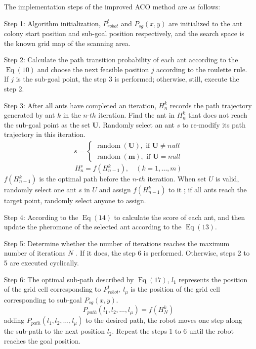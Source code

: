 \documentclass{iosart2c}
\begin{document}
The implementation steps of the improved ACO method are as follows:

Step 1: Algorithm initialization, $P_{robot}^{t}$ and $P_{sg}(x,y)$ are initialized to the ant colony start position and sub-goal position respectively, and the search space is the known grid map of the scanning area.

Step 2: Calculate the path transition probability of each ant according to the $\operatorname{Eq}(10)$ and choose the next feasible position $j$ according to the roulette rule. If $j$ is the sub-goal point, the step 3 is performed; otherwise, still, execute the step 2.

Step 3: After all ants have completed an iteration, $H_{n}^{k}$ records the path trajectory generated by ant $k$ in the $n$-$th$ iteration. Find the ant in $H_{n}^{k}$ that does not reach the sub-goal point as the set $\mathbf{U}$. Randomly select an ant $s$ to re-modify its path trajectory in this iteration.
\begin{equation} %
\begin{split}
s=\left\{\begin{array}{c}{\operatorname{random}(\mathbf{U}), \text { if } \mathbf{U} \neq { null }} \\ {\operatorname{random}(\mathbf{m}), \text { if } \mathbf{U}= { null }}\end{array}\right.
\end{split}
\end{equation}
\begin{equation} %
H_{n}^{s}=f\left(H_{n-1}^{k}\right), \quad(k=1, \ldots, m)
\end{equation}
$f\left(H_{n-1}^{k}\right)$ is the optimal path before the $n$-$th$ iteration. When set $U$ is valid, randomly select one ant $s$ in $U$ and assign $f\left(H_{n-1}^{k}\right)$ to it ; if all ants reach the target point, randomly select anyone to assign.

Step 4: According to the $\operatorname{Eq}(14)$ to calculate the score of each ant, and then update the pheromone of the selected ant according to the  $\operatorname{Eq}(13)$.

Step 5: Determine whether the number of iterations reaches the maximum number of iterations $N$ . If it does, the step 6 is performed. Otherwise, steps 2 to 5 are executed cyclically.

Step 6: The optimal sub-path described by $\operatorname{Eq}(17)$, $l_{1}$ represents the position of the grid cell corresponding to $P_{robot}^{t}$, $l_{\mu}$ is the position of the grid cell corresponding to sub-goal $P_{sg}(x,y)$.
\begin{equation} %
P_{path}\left(l_{1}, l_{2}, \ldots, l_{\mu}\right)=f\left(H_{N}^{k}\right)
\end{equation}
adding $P_{path}\left(l_{1}, l_{2}, \ldots, l_{\mu}\right)$ to the desired path, the robot moves one step along the sub-path to the next position $l_{2}$. Repeat the steps 1 to 6 until the robot reaches the goal position.
\end{document}
